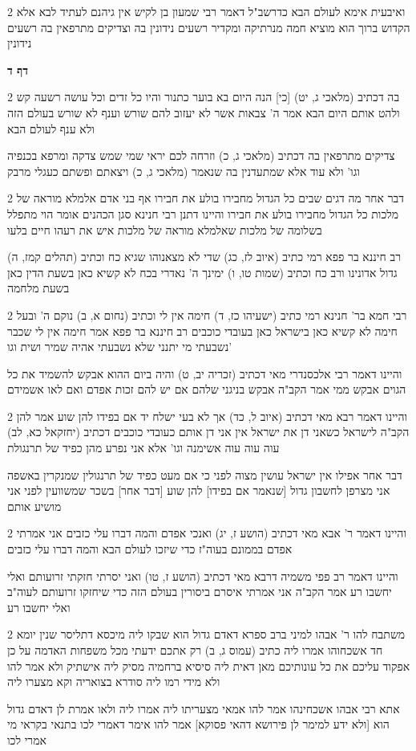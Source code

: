\documentclass[12pt, openany]{book}
\newcommand{\sethebfont}{
\fontsize{10.5pt}{21.0pt} \selectfont
}
\newcommand{\twocol}[1]{
	{\sethebfont \begin{multicols}{2}
			#1
	\end{multicols}}	
}
\newcommand{\sectname}{}
\newcommand{\newsection}[1]{
	\addcontentsline{toc}{section}{#1}
	\renewcommand{\sectname}{#1}	
	\vspace{-\baselineskip}
	\begin{center}
		\textbf{%
\fontsize{16pt}{16pt}\selectfont
			#1}
	\end{center}
	\vspace{-\baselineskip}
	\nopagebreak
}
\begin{document}
\twocol{ואיבעית אימא לעולם הבא כדרשב"ל דאמר רבי שמעון בן לקיש אין גיהנם לעתיד לבא אלא הקדוש ברוך הוא מוציא חמה מנרתיקה ומקדיר רשעים נידונין בה וצדיקים מתרפאין בה רשעים נידונין}
\newsection{דף ד}
\twocol{בה דכתיב (מלאכי ג, יט) [כי] הנה היום בא בוער כתנור והיו כל זדים וכל עושה רשעה קש ולהט אותם היום הבא אמר ה' צבאות אשר לא יעזוב להם שורש וענף לא שורש בעולם הזה ולא ענף לעולם הבא
\par צדיקים מתרפאין בה דכתיב (מלאכי ג, כ) וזרחה לכם יראי שמי שמש צדקה ומרפא בכנפיה וגו' ולא עוד אלא שמתעדנין בה שנאמר (מלאכי ג, כ) ויצאתם ופשתם כעגלי מרבק}
\twocol{דבר אחר מה דגים שבים כל הגדול מחבירו בולע את חבירו אף בני אדם אלמלא מוראה של מלכות כל הגדול מחבירו בולע את חבירו והיינו דתנן רבי חנינא סגן הכהנים אומר הוי מתפלל בשלומה של מלכות שאלמלא מוראה של מלכות איש את רעהו חיים בלעו
\par רב חיננא בר פפא רמי כתיב (איוב לז, כג) שדי לא מצאנוהו שגיא כח וכתיב (תהלים קמז, ה) גדול אדונינו ורב כח וכתיב (שמות טו, ו) ימינך ה' נאדרי בכח לא קשיא כאן בשעת הדין כאן בשעת מלחמה}
\twocol{רבי חמא בר' חנינא רמי כתיב (ישעיהו כז, ד) חימה אין לי וכתיב (נחום א, ב) נוקם ה' ובעל חימה לא קשיא כאן בישראל כאן בעובדי כוכבים רב חיננא בר פפא אמר חימה אין לי שכבר נשבעתי מי יתנני שלא נשבעתי אהיה שמיר ושית וגו'
\par והיינו דאמר רבי אלכסנדרי מאי דכתיב (זכריה יב, ט) והיה ביום ההוא אבקש להשמיד את כל הגוים אבקש ממי אמר הקב"ה אבקש בניגני שלהם אם יש להם זכות אפדם ואם לאו אשמידם}
\twocol{והיינו דאמר רבא מאי דכתיב (איוב ל, כד) אך לא בעי ישלח יד אם בפידו להן שוע אמר להן הקב"ה לישראל כשאני דן את ישראל אין אני דן אותם כעובדי כוכבים דכתיב (יחזקאל כא, לב) עוה עוה עוה אשימנה וגו' אלא אני נפרע מהן כפיד של תרנגולת
\par דבר אחר אפילו אין ישראל עושין מצוה לפני כי אם מעט כפיד של תרנגולין שמנקרין באשפה אני מצרפן לחשבון גדול [שנאמר אם בפידו] להן שוע [דבר אחר] בשכר שמשוועין לפני אני מושיע אותם}
\twocol{והיינו דאמר ר' אבא מאי דכתיב (הושע ז, יג) ואנכי אפדם והמה דברו עלי כזבים אני אמרתי אפדם בממונם בעוה"ז כדי שיזכו לעולם הבא והמה דברו עלי כזבים
\par והיינו דאמר רב פפי משמיה דרבא מאי דכתיב (הושע ז, טו) ואני יסרתי חזקתי זרועותם ואלי יחשבו רע אמר הקב"ה אני אמרתי איסרם ביסורין בעולם הזה כדי שיחזקו זרועותם לעוה"ב ואלי יחשבו רע}
\twocol{משתבח להו ר' אבהו למיני ברב ספרא דאדם גדול הוא שבקו ליה מיכסא דתליסר שנין יומא חד אשכחוהו אמרו ליה כתיב (עמוס ג, ב) רק אתכם ידעתי מכל משפחות האדמה על כן אפקוד עליכם את כל עונותיכם מאן דאית ליה סיסיא ברחמיה מסיק ליה אישתיק ולא אמר להו ולא מידי רמו ליה סודרא בצואריה וקא מצערו ליה
\par אתא רבי אבהו אשכחינהו אמר להו אמאי מצעריתו ליה אמרו ליה ולאו אמרת לן דאדם גדול הוא [ולא ידע למימר לן פירושא דהאי פסוקא]  אמר להו אימר דאמרי לכו בתנאי בקראי מי אמרי לכו}
\end{document}

